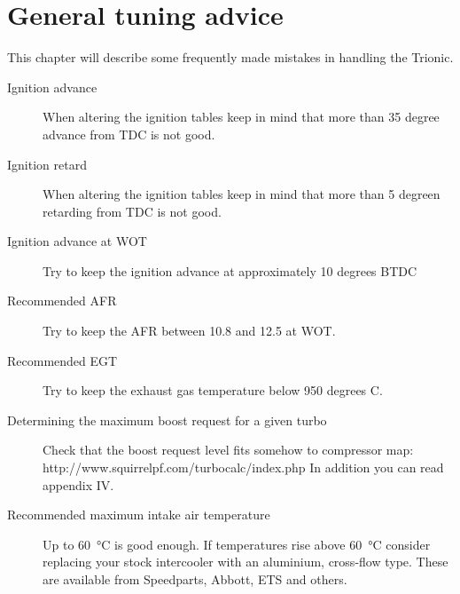 \documentclass[11pt,a4paper]{book}
\begin{document}
\chapter{General tuning advice}
This chapter will describe some frequently made mistakes in handling the Trionic.
\begin{description}
    \item[Ignition advance]
        When altering the ignition tables keep in mind that more than 35 degree advance from TDC is not good.
    \item[Ignition retard]
        When altering the ignition tables keep in mind that more than 5 degreen retarding from TDC is not good.
    \item[Ignition advance at WOT] Try to keep the ignition advance at
        approximately 10 degrees BTDC
    \item[Recommended AFR] Try to keep the AFR between 10.8 and 12.5 at WOT.
    \item[Recommended EGT] Try to keep the exhaust gas temperature below 950
        degrees C.
    \item[Determining the maximum boost request for a given turbo] Check that the boost request level fits somehow to compressor map:
        http://www.squirrelpf.com/turbocalc/index.php
        In addition you can read appendix IV.
    \item[Recommended maximum intake air temperature] Up to
        \SI{60}{\celsius} is good enough. If temperatures rise above
        \SI{60}{\celsius} consider replacing your stock
        intercooler with an aluminium, cross-flow type. These are available from Speedparts, Abbott, ETS and
        others.
\end{description}

\appendix
\printindex
\end{document}
